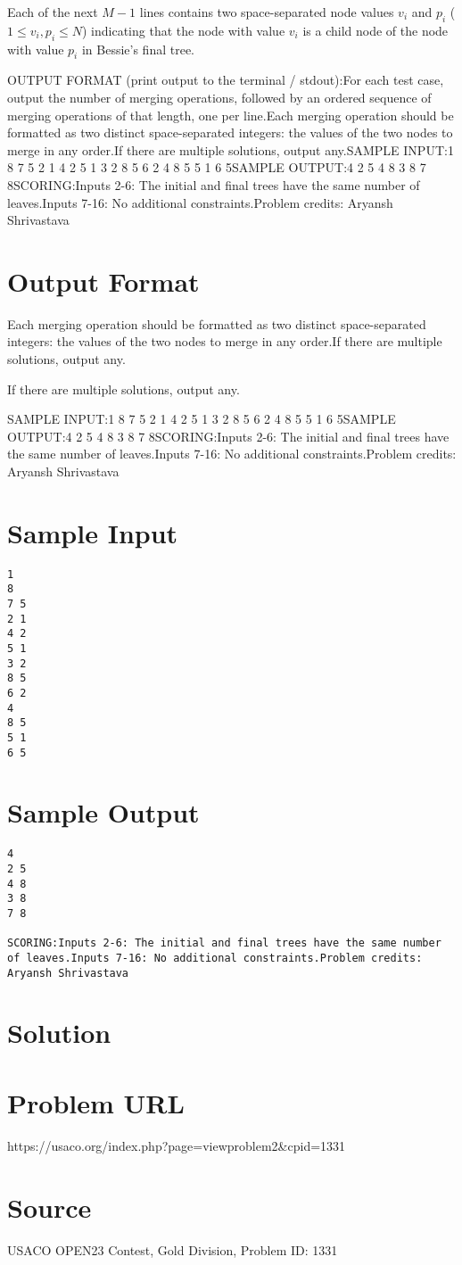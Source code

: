 \documentclass[12pt]{article}
\begin{document}
Each of the next $M-1$ lines contains two space-separated node values $v_i$ and
$p_i$ ($1 \leq v_i, p_i \leq N$) indicating that the node with value $v_i$ is a
child node of the node with value $p_i$ in Bessie's final tree.

OUTPUT FORMAT (print output to the terminal / stdout):For each test case, output the number of merging operations, followed by an
ordered sequence of merging operations of that length, one per line.Each merging operation should be formatted as two distinct space-separated
integers: the values of the two nodes to merge in any order.If there are multiple solutions, output any.SAMPLE INPUT:1
8
7 5
2 1
4 2
5 1
3 2
8 5
6 2
4
8 5
5 1
6 5SAMPLE OUTPUT:4
2 5
4 8
3 8
7 8SCORING:Inputs 2-6: The initial and final trees have the same number of leaves.Inputs 7-16: No additional constraints.Problem credits: Aryansh Shrivastava

\section*{Output Format}
Each merging operation should be formatted as two distinct space-separated
integers: the values of the two nodes to merge in any order.If there are multiple solutions, output any.

If there are multiple solutions, output any.

SAMPLE INPUT:1
8
7 5
2 1
4 2
5 1
3 2
8 5
6 2
4
8 5
5 1
6 5SAMPLE OUTPUT:4
2 5
4 8
3 8
7 8SCORING:Inputs 2-6: The initial and final trees have the same number of leaves.Inputs 7-16: No additional constraints.Problem credits: Aryansh Shrivastava

\section*{Sample Input}
\begin{verbatim}
1
8
7 5
2 1
4 2
5 1
3 2
8 5
6 2
4
8 5
5 1
6 5
\end{verbatim}

\section*{Sample Output}
\begin{verbatim}
4
2 5
4 8
3 8
7 8

SCORING:Inputs 2-6: The initial and final trees have the same number of leaves.Inputs 7-16: No additional constraints.Problem credits: Aryansh Shrivastava
\end{verbatim}

\section*{Solution}


\section*{Problem URL}
https://usaco.org/index.php?page=viewproblem2&cpid=1331

\section*{Source}
USACO OPEN23 Contest, Gold Division, Problem ID: 1331
\end{document}
